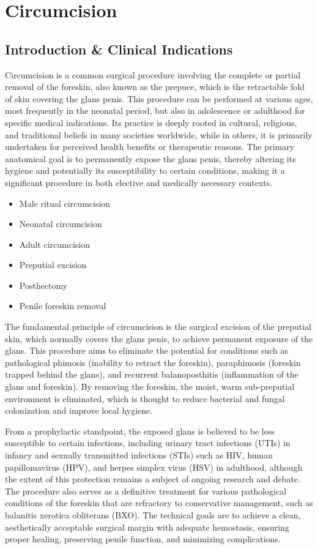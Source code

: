 \chapter{Circumcision}

\section*{Introduction \& Clinical Indications}
Circumcision is a common surgical procedure involving the complete or partial removal of the foreskin, also known as the prepuce, which is the retractable fold of skin covering the glans penis. This procedure can be performed at various ages, most frequently in the neonatal period, but also in adolescence or adulthood for specific medical indications. Its practice is deeply rooted in cultural, religious, and traditional beliefs in many societies worldwide, while in others, it is primarily undertaken for perceived health benefits or therapeutic reasons. The primary anatomical goal is to permanently expose the glans penis, thereby altering its hygiene and potentially its susceptibility to certain conditions, making it a significant procedure in both elective and medically necessary contexts.

\begin{itemize}
  \item Male ritual circumcision
  \item Neonatal circumcision
  \item Adult circumcision
  \item Preputial excision
  \item Posthectomy
  \item Penile foreskin removal
\end{itemize}

The fundamental principle of circumcision is the surgical excision of the preputial skin, which normally covers the glans penis, to achieve permanent exposure of the glans. This procedure aims to eliminate the potential for conditions such as pathological phimosis (inability to retract the foreskin), paraphimosis (foreskin trapped behind the glans), and recurrent balanoposthitis (inflammation of the glans and foreskin). By removing the foreskin, the moist, warm sub-preputial environment is eliminated, which is thought to reduce bacterial and fungal colonization and improve local hygiene.

From a prophylactic standpoint, the exposed glans is believed to be less susceptible to certain infections, including urinary tract infections (UTIs) in infancy and sexually transmitted infections (STIs) such as HIV, human papillomavirus (HPV), and herpes simplex virus (HSV) in adulthood, although the extent of this protection remains a subject of ongoing research and debate. The procedure also serves as a definitive treatment for various pathological conditions of the foreskin that are refractory to conservative management, such as balanitis xerotica obliterans (BXO). The technical goals are to achieve a clean, aesthetically acceptable surgical margin with adequate hemostasis, ensuring proper healing, preserving penile function, and minimizing complications.

